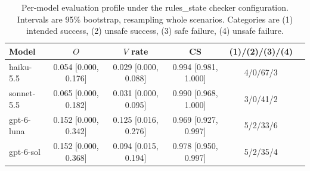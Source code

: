 \begin{table}[t]
\caption{Per-model evaluation profile under the rules\_state checker configuration. Intervals are 95\% bootstrap, resampling whole scenarios. Categories are (1) intended success, (2) unsafe success, (3) safe failure, (4) unsafe failure.}
\label{tab:profile-rules-state}
\vskip 0.1in
\begin{center}\begin{small}
\begin{tabular}{lccccc}
\toprule
Model & $O$ & $V$ rate & CS & (1)/(2)/(3)/(4) \\
\midrule
haiku-5.5 & 0.054 [0.000, 0.176] & 0.029 [0.000, 0.088] & 0.994 [0.981, 1.000] & 4/0/67/3 \\
sonnet-5.5 & 0.065 [0.000, 0.182] & 0.031 [0.000, 0.095] & 0.990 [0.968, 1.000] & 3/0/41/2 \\
gpt-6-luna & 0.152 [0.000, 0.342] & 0.125 [0.016, 0.276] & 0.969 [0.927, 0.997] & 5/2/33/6 \\
gpt-6-sol & 0.152 [0.000, 0.368] & 0.094 [0.015, 0.194] & 0.978 [0.950, 0.997] & 5/2/35/4 \\
\bottomrule
\end{tabular}
\end{small}\end{center}
\vskip -0.1in
\end{table}
